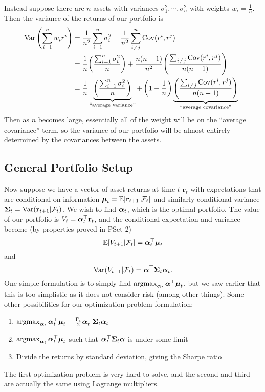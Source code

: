 Instead suppose there are $n$ assets with variances $\sigma_1^2,\cdots,\sigma_n^2$ with weights $w_i=\frac{1}{n}$. Then the variance of the returns of our portfolio is \begin{align*}
	\operatorname{Var} \left( \sum_{i=1}^{n} w_ir^i  \right) &= \frac{1}{n^2} \sum_{i=1}^{n} \sigma_i^2 + \frac{1}{n^2} \sum_{i\neq j}^{n} \operatorname{Cov}(r^i,r^j) \\
											   &= \frac{1}{n} {\left( \frac{\sum_{i=1}^{n} \sigma_i^2}{n} \right)} + \frac{n(n-1)}{n^2} {\left( \frac{\sum_{i\neq j}\operatorname{Cov}(r^i,r^j)}{n(n-1)} \right)} \\
											   &= \frac{1}{n} \underbrace{\left( \frac{\sum_{i=1}^{n} \sigma_i^2}{n} \right)}_{\text{``average variance''}} + \left( 1-\frac{1}{n} \right) \underbrace{\left( \frac{\sum_{i\neq j}\operatorname{Cov}(r^i,r^j)}{n(n-1)} \right)}_{\text{``average covariance''}}.
\end{align*} Then as $n$ becomes large, essentially all of the weight will be on the ``average covariance'' term, so the variance of our portfolio will be almost entirely determined by the covariances between the assets.

\subsection{General Portfolio Setup}
Now suppose we have a vector of asset returns at time $t$ $\mathbf r_t$ with expectations that are conditional on information $\boldsymbol{\mu}_t = \mathbb E[\mathbf r_{t+1}|\mathcal F_t]$ and similarly conditional variance $\boldsymbol{\Sigma}_t = \operatorname{Var}(\mathbf r_{t+1}|\mathcal F_t)$. We wish to find $\boldsymbol{\alpha}_t$, which is the optimal portfolio. The value of our portfolio is $V_t = \boldsymbol{\alpha}_t^\top\mathbf r_t$, and the conditional expectation and variance become (by properties proved in PSet 2) $$ \mathbb E[V_{t+1}|\mathcal F_t] = \boldsymbol{\alpha}_t^\top\boldsymbol{\mu}_t $$ and $$ \operatorname{Var}(V_{t+1}|\mathcal F_t) = \boldsymbol{\alpha}^\top\boldsymbol{\Sigma}_t\boldsymbol{\alpha}_t. $$ One simple formulation is to simply find $\operatorname*{arg max}_{\boldsymbol{\alpha}_t}\boldsymbol{\alpha}^\top\boldsymbol{\mu}_t$, but we saw earlier that this is too simplistic as it does not consider risk (among other things). Some other possibilities for our optimization problem formulation: \begin{enumerate}
	\item $\operatorname*{arg max}_{\boldsymbol{\alpha}_t}\boldsymbol{\alpha}_t^\top\boldsymbol{\mu}_t-\frac{\Gamma_t}{2}\boldsymbol{\alpha}_t^\top\boldsymbol{\Sigma}_t\boldsymbol{\alpha}_t$
	\item $\operatorname*{arg max}_{\boldsymbol{\alpha}_t}\boldsymbol{\alpha}_t^\top\boldsymbol{\mu}_t$ such that $\boldsymbol{\alpha}_t^\top\boldsymbol{\Sigma}_t\boldsymbol{\alpha}$ is under some limit
	\item Divide the returns by standard deviation, giving the Sharpe ratio
\end{enumerate} The first optimization problem is very hard to solve, and the second and third are actually the same using Lagrange multipliers.

